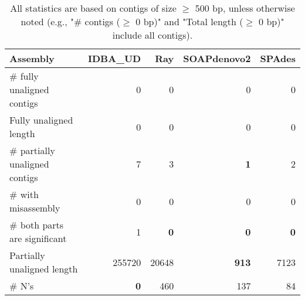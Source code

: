 \documentclass[12pt,a4paper]{article}
\begin{document}
\begin{table}[ht]
\begin{center}
\caption{All statistics are based on contigs of size $\geq$ 500 bp, unless otherwise noted (e.g., "\# contigs ($\geq$ 0 bp)" and "Total length ($\geq$ 0 bp)" include all contigs).}
\begin{tabular}{|l*{4}{|r}|}
\hline
Assembly & IDBA\_UD & Ray & SOAPdenovo2 & SPAdes \\ \hline
\# fully unaligned contigs & 0 & 0 & 0 & 0 \\ \hline
Fully unaligned length & 0 & 0 & 0 & 0 \\ \hline
\# partially unaligned contigs & 7 & 3 & {\bf 1} & 2 \\ \hline
\hspace{5mm}\# with misassembly & 0 & 0 & 0 & 0 \\ \hline
\hspace{5mm}\# both parts are significant & 1 & {\bf 0} & {\bf 0} & {\bf 0} \\ \hline
Partially unaligned length & 255720 & 20648 & {\bf 913} & 7123 \\ \hline
\# N's & {\bf 0} & 460 & 137 & 84 \\ \hline
\end{tabular}
\end{center}
\end{table}
\end{document}
